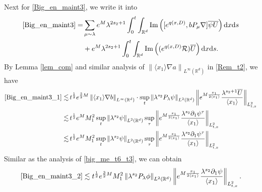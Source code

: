 \documentclass[10pt,twoside,a4paper]{article}
\numberwithin{equation}{section}\allowdisplaybreaks
\begin{document}
Next for  \eqref{Big_en_maint3}, we write it into
\begin{align}
	\eqref{Big_en_maint3}=&\sum_{\mu\sim \lambda}	e^{M} \lambda^{2s_2+1}\int_0^t \int_{\mathbb{R}^d}  \mathrm{Im} \left(     [e^{q (x,D)}, b  P_\mu \nabla] \overline{\psi}\overline{U}\right)  \mathrm{d} x \mathrm{d} s \label{Big_en_maint3_1}\\
	&	+e^{M} \lambda^{2s_2+1}\int_0^t \int_{\mathbb{R}^d}  \mathrm{Im} \left(   ( e^{q (x,D)}\mathcal{R}) \overline{U}\right)  \mathrm{d} x \mathrm{d} s.\label{Big_en_maint3_2}
\end{align}
By   Lemma \ref{lem_com} and similar analysis of $\left\|\langle x_1\rangle \nabla a  \right\|_{L^{\infty}(\mathbb{R}^d)} $ in  \eqref{Rem_t2}, we have
\begin{align*}
	\eqref{Big_en_maint3_1}\lesssim &\,  t^{\frac12} e^{\frac 32M}\left\|\langle x_1\rangle  \nabla  b \right\|_{L^{\infty}(\mathbb{R}^d)} \cdot \sup_{t }\left\| \lambda^{s_2} P_\lambda \psi \right\|_{L^{2}(\mathbb{R}^d)}   \left\|e^{M \frac{x_1}{2\langle x_1\rangle} }  \frac{\lambda^{s_2+1} \overline{U}}{\langle x_1\rangle }  \right\|_{L^2_{t,x}}\\
	\lesssim &\, t^{\frac12} e^{M}M_1^2  \sup_{t }\left\| \lambda^{s_2} \psi\right\|_{L^{2}(\mathbb{R}^d)}  \sup_{\tau}   \left\| e^{M \frac{x_1}{2\langle x_1\rangle} }  \frac{\lambda^{s_2}  \partial_1\psi^{\tau }}{\langle x_1\rangle } \right\|_{L^2_{t,x}}\\
	\lesssim &  \,t^{\frac12} e^{M} M_1^2  \sup_{t }\left\| \lambda^{s_2} \psi\right\|_{L^{2}(\mathbb{R}^d)}  \sup_{\tau}   \left\| e^{M \frac{x_1}{2\langle x_1\rangle} }  \frac{\lambda^{s_2}  \partial_1\psi^{\tau }}{\langle x_1\rangle } \right\|_{L^2_{t,x}}
\end{align*}
Similar as the analysis of \eqref{big_me_t6_t3}, we can obtain 
\begin{align*}
	\eqref{Big_en_maint3_2}\lesssim   t^{\frac 12} e^{\frac 32 M}   M_1^2 \left\|\lambda^{s_2}  P_\lambda   \phi\right\|_{L^{2}(\mathbb{R}^d)} \left\| e^{M \frac{x_1}{2\langle x_1\rangle} } \frac{\lambda^{s_2}\partial_1 \psi }{\langle x_1\rangle }  \right\|_{L^2_{t,x}}.
\end{align*}
\end{document}
